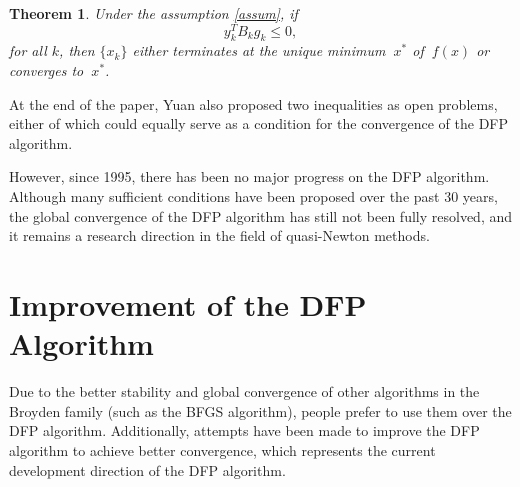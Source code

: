 \documentclass[12pt,a4paper]{article}  %
\newcounter{cite}
\newtheorem{theorem}{Theorem}[section]
\theoremstyle{definition}
\numberwithin{equation}{section}
\begin{document}
\begin{theorem}
	Under the assumption \ref{assum}, if \begin{equation}
		y_k^T B_k g_k \leq 0, 
	\end{equation} for all \(k\), then \(\{x_k\}\) either terminates at the unique minimum \(~x^*\) of \(~f(x)\) or converges to \(~x^*\).
\end{theorem}
At the end of the paper, Yuan also proposed two inequalities as open problems, either of which could equally serve as a condition for the convergence of the DFP algorithm.

However, since 1995, there has been no major progress on the DFP algorithm. Although many sufficient conditions\cite{YYSU199802003,GXKZ200201015,DQSY200101020} have been proposed over the past 30 years, the global convergence of the DFP algorithm has still not been fully resolved, and it remains a research direction in the field of quasi-Newton methods. 

\section{Improvement of the DFP Algorithm}
Due to the better stability and global convergence of other algorithms in the Broyden family (such as the BFGS algorithm), people prefer to use them over the DFP algorithm. Additionally, attempts have been made to improve the DFP algorithm to achieve better convergence, which represents the current development direction of the DFP algorithm.
\end{document}
